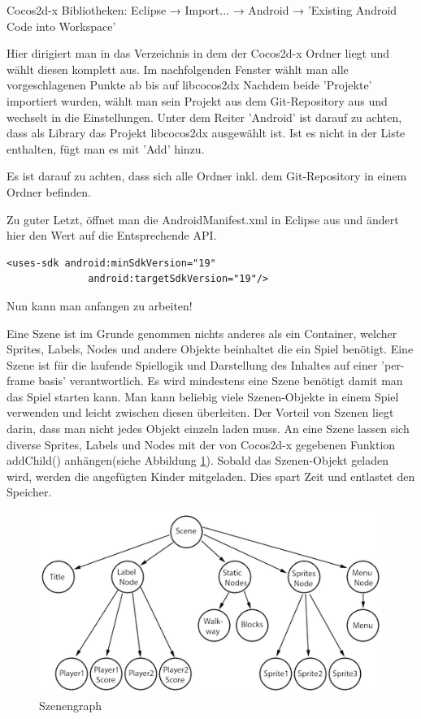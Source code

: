 	Cocos2d-x Bibliotheken: Eclipse → Import... → Android → 'Existing Android Code into 	Workspace'

Hier dirigiert man in das Verzeichnis in dem der Cocos2d-x Ordner liegt und wählt diesen komplett aus. Im nachfolgenden Fenster wählt man alle vorgeschlagenen Punkte ab bis auf libcocos2dx Nachdem beide 'Projekte' importiert wurden, wählt man sein Projekt aus dem Git-Repository aus und wechselt in die Einstellungen. Unter dem Reiter 'Android' ist darauf zu achten, dass als Library das Projekt libcocos2dx ausgewählt ist. Ist es nicht in der Liste enthalten, fügt man es mit 'Add' hinzu. 

Es ist darauf zu achten, dass sich alle Ordner inkl. dem Git-Repository in einem Ordner befinden.

Zu guter Letzt, öffnet man die AndroidManifest.xml in Eclipse aus und ändert hier den Wert auf die Entsprechende API.
\begin{lstlisting}[style=singleline]
	<uses-sdk android:minSdkVersion="19"
			  android:targetSdkVersion="19"/>
\end{lstlisting}
	

Nun kann man anfangen zu arbeiten! 



\label{sec:2_Szenenprinzip}
Eine Szene ist im Grunde genommen nichts anderes als ein Container, welcher  Sprites, Labels, Nodes und andere Objekte beinhaltet die ein Spiel benötigt. Eine Szene ist für die laufende Spiellogik und Darstellung des Inhaltes auf einer 'per-frame basis' verantwortlich. Es wird mindestens eine Szene benötigt damit man das Spiel starten kann. Man kann beliebig viele Szenen-Objekte in einem Spiel verwenden und leicht zwischen diesen überleiten. Der Vorteil von Szenen liegt darin, dass man nicht jedes Objekt einzeln laden muss. An eine Szene lassen sich diverse Sprites, Labels und Nodes mit der von Cocos2d-x gegebenen Funktion addChild() anhängen(siehe Abbildung \ref{fig:szenengraph}). Sobald das Szenen-Objekt geladen wird, werden die angefügten Kinder mitgeladen. Dies spart Zeit und entlastet den Speicher.

\begin{figure}[H]
  \centering
  \includegraphics[width=12cm]{resources/scenegraph}
  \caption{Szenengraph}
  \label{fig:szenengraph} 
\end{figure}


